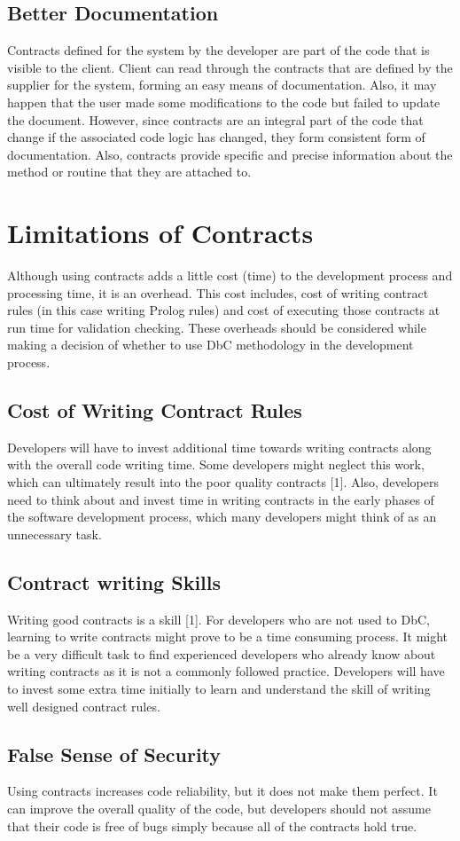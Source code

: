 \subsection{Better Documentation}
Contracts defined for the system by the developer are part of the code that is visible to the client. Client can read through the contracts that are defined by the supplier for the system, forming an easy means of documentation. Also, it may happen that the user made some modifications to the code but failed to update the document. However, since contracts are an integral part of the code that change if the associated code logic has changed, they form consistent form of documentation. Also, contracts provide specific and precise information about the method or routine that they are attached to.

\section{Limitations of Contracts}
Although using contracts adds a little cost (time) to the development process and processing time, it is an overhead. This cost includes, cost of writing contract rules (in this case writing Prolog rules) and cost of executing those contracts at run time for validation checking. These overheads should be considered while making a decision of whether to use DbC methodology in the development process.

\subsection{Cost of Writing Contract Rules}
Developers will have to invest additional time towards writing contracts along with the overall code writing time. Some developers might neglect this work, which can ultimately result into the poor quality contracts [1].
Also, developers need to think about and invest time in writing contracts in the early phases of the software development process, which many developers might think of as an unnecessary task.

\subsection{Contract writing Skills}
Writing good contracts is a skill [1]. For developers who are not used to DbC, learning to write contracts might prove to be a time consuming process. It might be a very difficult task to find experienced developers who already know about writing contracts as it is not a commonly followed practice. Developers will have to invest some extra time initially to learn and understand the skill of writing well designed contract rules.

\subsection{False Sense of Security}
Using contracts increases code reliability, but it does not make them perfect. It can improve the overall quality of the code, but developers should not assume that their code is free of bugs simply because all of the contracts hold true.
